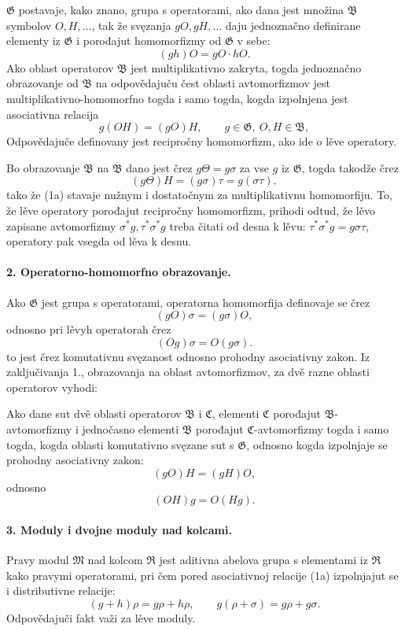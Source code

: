 \documentclass[11pt]{article}
\providecommand{\frB}{\mathfrak B}
\providecommand{\frC}{\mathfrak C}
\providecommand{\frG}{\mathfrak G}
\providecommand{\frM}{\mathfrak M}
\providecommand{\frR}{\mathfrak R}
\begin{document}
\(\frG\) postavaje, kako znano, grupa s operatorami, ako dana jest množina \(\frB\) symbolov \(O,H,\ldots\), tak že svęzanja \(gO,gH,\ldots\) daju jednoznačno definirane elementy iz \(\frG\) i porođajut homomorfizmy od \(\frG\) v sebe:
\[
        (gh)O=gO\cdot hO .
\]
Ako oblast operatorov \(\frB\) jest multiplikativno zakryta, togda jednoznačno obrazovanje od \(\frB\) na odpovědajuču čest oblasti avtomorfizmov jest multiplikativno-homomorfno togda i samo togda, kogda izpolnjena jest asociativna relacija
\[
        g(OH)=(gO)H, \qquad g\in\frG,\ O,H\in\frB,                       \tag{1a}
\]
Odpovědajuče definovany jest recipročny homomorfizm, ako ide o lěve operatory.

Bo obrazovanje \(\frB\) na \(\overline{\frB}\) dano jest črez \(g\Theta=g\sigma\) za vse \(g\) iz \(\frG\), togda takodže črez
\[
        (g\Theta)H=(g\sigma)\tau=g(\sigma\tau),
\]
tako že (1a) stavaje nužnym i dostatočnym za multiplikativnu homomorfiju. To, že lěve operatory porođajut recipročny homomorfizm, prihodi odtud, že lěvo zapisane avtomorfizmy \(\sigma^\ast g,\tau^\ast\sigma^\ast g\) treba čitati od desna k lěvu: \(\tau^\ast\sigma^\ast g=g\sigma\tau\), operatory pak vsegda od lěva k desnu.

\paragraph{2. Operatorno-homomorfno obrazovanje.}
Ako \(\frG\) jest grupa s operatorami, operatorna homomorfija definovaje se črez
\[
        (gO)\sigma=(g\sigma)O,                                          \tag{2}
\]
odnosno pri lěvyh operatorah črez
\[
        (Og)\sigma=O(g\sigma).                                          \tag{2*}
\]
to jest črez komutativnu svęzanost odnosno prohodny asociativny zakon. Iz zaključivanja 1., obrazovanja na oblast avtomorfizmov, za dvě razne oblasti operatorov vyhodi:

Ako dane sut dvě oblasti operatorov \(\frB\) i \(\frC\), elementi \(\frC\) porođajut \(\frB\)-avtomorfizmy i jednočasno elementi \(\frB\) porođajut \(\frC\)-avtomorfizmy togda i samo togda, kogda oblasti komutativno svęzane sut s \(\frG\), odnosno kogda izpolnjaje se prohodny asociativny zakon:
\[
        (gO)H=(gH)O,                                                    \tag{2a}
\]
odnosno
\[
        (OH)g=O(Hg).                                                    \tag{2a*}
\]

\paragraph{3. Moduly i dvojne moduly nad kolcami.}
Pravy modul \(\frM\) nad kolcom \(\frR\) jest aditivna abelova grupa s elementami iz \(\frR\) kako pravymi operatorami, pri čem pored asociativnoj relacije (1a) izpolnjajut se i distributivne relacije:
\[
        (g+h)\rho=g\rho+h\rho,\qquad
        g(\rho+\sigma)=g\rho+g\sigma.                                  \tag{3a}
\]
Odpovědajuči fakt važi za lěve moduly.
\end{document}
